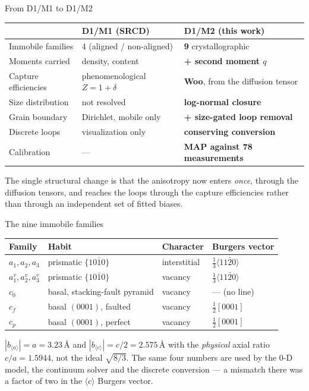 \documentclass[aspectratio=169,10pt]{beamer}
\newcommand{\cloop}{$\langle c\rangle$}
\newcommand{\foot}[1]{\par\vspace{1ex}%
  \begingroup\footnotesize\raggedright #1\par\endgroup}
\begin{document}
\begin{frame}{From D1/M1 to D1/M2}
\centering
\small\begin{tabular}{@{}p{}p{}p{}@{}}
\toprule
 & \textbf{D1/M1 (SRCD)} & \textbf{D1/M2 (this work)} \\
\midrule
Immobile families & 4 (aligned / non-aligned) & \textbf{9} crystallographic \\
Moments carried & density, content & \textbf{+ second moment $q$} \\
Capture efficiencies & phenomenological $Z=1+\delta$ & \textbf{Woo}, from the
  diffusion tensor \\
Size distribution & not resolved & \textbf{log-normal closure} \\
Grain boundary & Dirichlet, mobile only & \textbf{+ size-gated loop removal} \\
Discrete loops & visualization only & \textbf{conserving conversion} \\
Calibration & --- & \textbf{MAP against 78 measurements} \\
\bottomrule
\end{tabular}
\foot{The single structural change is that the anisotropy now enters
\emph{once}, through the diffusion tensors, and reaches the loops through the
capture efficiencies rather than through an independent set of fitted biases.}
\end{frame}

\begin{frame}{The nine immobile families}
\centering
\begin{tabular}{@{}llll@{}}
\toprule
Family & Habit & Character & Burgers vector \\
\midrule
$a_1,a_2,a_3$ & prismatic $\{10\bar10\}$ & interstitial & $\tfrac13\langle11\bar20\rangle$ \\
$a_1^{v},a_2^{v},a_3^{v}$ & prismatic $\{10\bar10\}$ & vacancy & $\tfrac13\langle11\bar20\rangle$ \\
$c_0$ & basal, stacking-fault pyramid & vacancy & --- (no line) \\
$c_f$ & basal $(0001)$, faulted & vacancy & $\tfrac12[0001]$ \\
$c_p$ & basal $(0001)$, perfect & vacancy & $\tfrac12[0001]$ \\
\bottomrule
\end{tabular}
\vspace{1ex}
\foot{$|b_{\langle a\rangle}|=a=3.23$\,\AA{} and $|b_{\langle c\rangle}|=c/2=2.575$\,\AA{}
with the \emph{physical} axial ratio $c/a=1.5944$, not the ideal $\sqrt{8/3}$.
The same four numbers are used by the 0-D model, the continuum solver and the
discrete conversion --- a mismatch there was a factor of two in the \cloop{}
Burgers vector.}
\end{frame}
\end{document}
